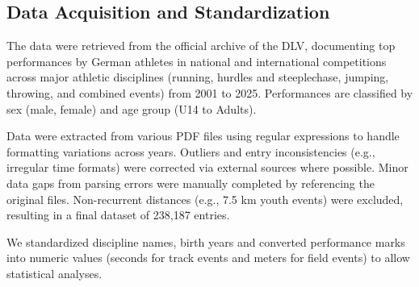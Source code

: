 \subsection{Data Acquisition and Standardization}
The data were retrieved from the official archive of the DLV, documenting top performances by German athletes in national and international competitions across major athletic disciplines (running, hurdles and steeplechase, jumping, throwing, and combined events) from 2001 to 2025. Performances are classified by sex (male, female) and age group (U14 to Adults).

Data were extracted from various PDF files using regular expressions to handle formatting variations across years. Outliers and entry inconsistencies (e.g., irregular time formats) were corrected via external sources where possible. Minor data gaps from parsing errors were manually completed by referencing the original files. Non-recurrent distances (e.g., 7.5 km youth events) were excluded, resulting in a final dataset of 238,187 entries.

We standardized discipline names, birth years and converted performance marks into numeric values (seconds for track events and meters for field events) to allow statistical analyses. 